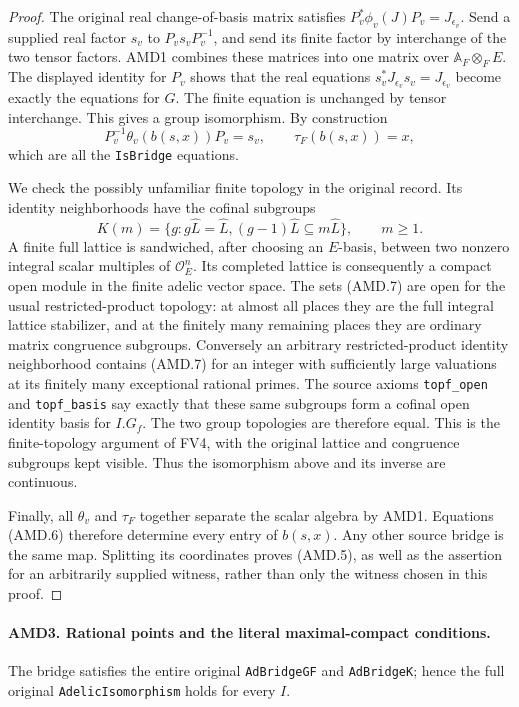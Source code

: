 \begin{proof}
The original real change-of-basis matrix satisfies
\(P_v^*\phi_v(J)P_v=J_{\epsilon_v}\).  Send a supplied real
factor \(s_v\) to \(P_vs_vP_v^{-1}\), and send its finite
factor by interchange of the two tensor factors.  AMD1 combines
these matrices into one matrix over \(\mathbb A_F\otimes_F E\).
The displayed identity for \(P_v\) shows that the real equations
\(s_v^*J_{\epsilon_v}s_v=J_{\epsilon_v}\) become exactly the
equations for \(G\).  The finite equation is unchanged by tensor
interchange.  This gives a group isomorphism.  By construction
\[
 P_v^{-1}\theta_v(b(s,x))P_v=s_v,
 \qquad \tau_F(b(s,x))=x,
 \tag{AMD.6}
\]
which are all the \texttt{IsBridge} equations.

We check the possibly unfamiliar finite topology in the original
record.  Its identity neighborhoods have the cofinal subgroups
\[
 K(m)=\{g:g\widehat L=\widehat L,
                    (g-1)\widehat L\subseteq m\widehat L\},
                    \qquad m\ge1.
 \tag{AMD.7}
\]
A finite full lattice is sandwiched, after choosing an \(E\)-basis,
between two nonzero integral scalar multiples of \(\mathcal O_E^n\).
Its completed lattice is consequently a compact open module in
the finite adelic vector space.  The sets (AMD.7) are open for the
usual restricted-product topology: at almost all places they are
the full integral lattice stabilizer, and at the finitely many
remaining places they are ordinary matrix congruence subgroups.
Conversely an arbitrary restricted-product identity neighborhood
contains (AMD.7) for an integer with sufficiently large valuations
at its finitely many exceptional rational primes.  The source
axioms \texttt{topf\_open} and \texttt{topf\_basis} say exactly
that these same subgroups form a cofinal open identity basis for
\(I.G_f\).  The two group topologies are therefore equal.  This
is the finite-topology argument of FV4, with the original lattice
and congruence subgroups kept visible.  Thus the isomorphism above
and its inverse are continuous.

Finally, all \(\theta_v\) and \(\tau_F\) together separate
the scalar algebra by AMD1.  Equations (AMD.6) therefore determine
every entry of \(b(s,x)\).  Any other source bridge is the same
map.  Splitting its coordinates proves (AMD.5), as well as the
assertion for an arbitrarily supplied witness, rather than only
the witness chosen in this proof.
\end{proof}

\paragraph{AMD3. Rational points and the literal maximal-compact conditions.}
\label{claim:AMD3}
The bridge satisfies the entire original \texttt{AdBridgeGF} and
\texttt{AdBridgeK}; hence the full original
\texttt{AdelicIsomorphism} holds for every \(I\).

